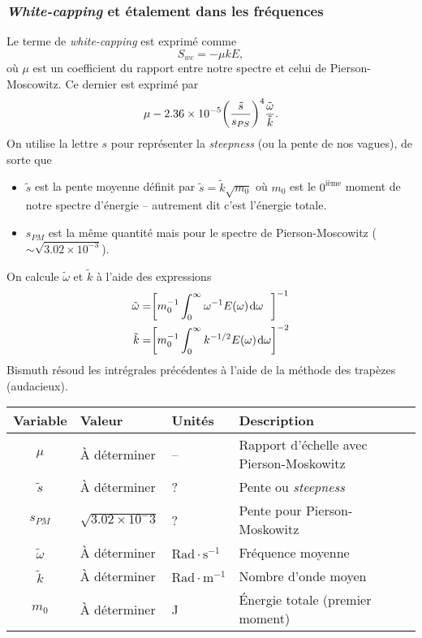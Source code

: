 \documentclass[10pt]{article}
\numberwithin{equation}{section}
\newcommand{\pt}{\hspace{1pt}} %
\newcommand{\rad}{\text{Rad}}
\begin{document}
\subsubsection{\emph{White-capping} et étalement dans les fréquences}
\label{sec:orgaece676}

Le terme de \emph{white-capping} est exprimé \autocite{hasselmann1974spectral} comme
\begin{equation}
   S_{wc} = -\mu kE,
\end{equation}
où \(\mu\) est un coefficient du rapport entre notre spectre et celui de Pierson-Moscowitz.
Ce dernier est exprimé par
\begin{equation}
   \mu - 2.36\times 10^{-5} \qty(\frac{\tilde{s}}{s_{PS}})^4 \frac{\tilde{\omega}}{\tilde{k}}.
\end{equation}
On utilise la lettre \(s\) pour représenter la \emph{steepness} (ou la pente de nos vagues), de sorte que
\begin{itemize}
\item \(\tilde{s}\) est la pente moyenne définit par \(\tilde{s} = \tilde{k} \sqrt{m_0}\) où \(m_0\) est le \(0^\text{ième}\) moment de notre spectre d'énergie -- autrement dit c'est l'énergie totale.
\item \(s_{PM}\) est la même quantité mais pour le spectre de Pierson-Moscowitz (\(\sim \sqrt{3.02\times10^{-3}}\)).
\end{itemize}
On calcule \(\tilde{\omega}\) et \(\tilde{k}\) à l'aide des expressions
\begin{subequations}
\begin{align}
   \tilde{\omega} =& \qty[m_0^{-1} \int_0^\infty \omega^{-1} E(\omega)\pt \dd \omega\ \ ]^{-1} \\
   \tilde{k} =& \qty[m_0^{-1} \int_0^\infty k^{-1/2} E(\omega)\pt \dd \omega]^{-2}
\end{align}
\end{subequations}
Bismuth résoud les intrégrales précédentes à l'aide de la méthode des trapèzes (audacieux).

\begin{center}
\begin{tabular}{clll}
Variable & Valeur & Unités & Description\\
\hline
\(\mu\) & À déterminer & -- & Rapport d'échelle avec Pierson-Moskowitz\\
\(\tilde{s}\) & À déterminer & ? & Pente ou \emph{steepness}\\
\(s_{PM}\) & \(\sqrt{3.02\times10^-3}\) & ? & Pente pour Pierson-Moskowitz\\
\(\tilde{\omega}\) & À déterminer & \(\rad\cdot \mathrm{s}^{-1}\) & Fréquence moyenne\\
\(\tilde{k}\) & À déterminer & \(\rad\cdot \mathrm{m}^{-1}\) & Nombre d'onde moyen\\
\(m_0\) & À déterminer & J & Énergie totale (premier moment)\\
\end{tabular}
\end{center}
\end{document}
